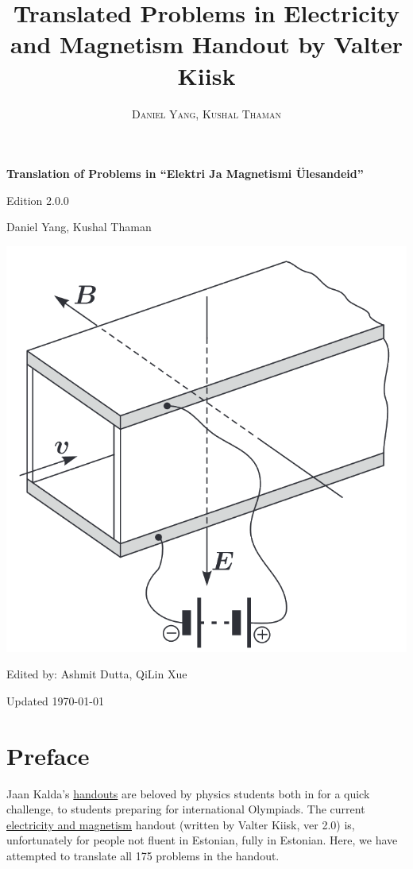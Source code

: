 \documentclass[11pt]{article}
\title{Translated Problems in Electricity and Magnetism Handout by Valter Kiisk}
\author{\textsc{Daniel Yang, Kushal Thaman}}
\begin{document}
\begin{titlepage}
    \begin{center}
        \vspace*{1cm}
 
        \Huge
        \textbf{Translation of Problems in “Elektri Ja Magnetismi Ülesandeid”}
 
        \vspace{0.5cm}
        \LARGE
        Edition 2.0.0
        
        \vspace{1cm}
        Daniel Yang, Kushal Thaman

\begin{center} %
\includegraphics[scale=0.47]{Title.png}
\end{center}
        \vfill
        \Large
        Edited by: Ashmit Dutta, QiLin Xue
        
        \Large
        Updated
        \today
 
    \end{center}
\end{titlepage}
\newpage
\section*{Preface}
\vspace{-5mm}
\indent Jaan Kalda's \href{https://www.ioc.ee/~kalda/ipho/}{handouts} are beloved by physics students both in for a quick challenge, to students preparing for international Olympiads. The current \href{https://www.ioc.ee/~kalda/ipho/Elekter.pdf}{electricity and magnetism} handout (written by Valter Kiisk, ver 2.0) is, unfortunately for people not fluent in Estonian, fully in Estonian. Here, we have attempted to translate all 175 problems in the handout.
\end{document}
